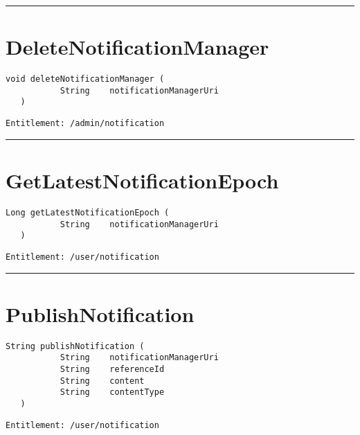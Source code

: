 \rule{12cm}{2pt}
\section{DeleteNotificationManager}
\label{Api:DeleteNotificationManager}
\begin{lstlisting}[style=nonumbers]
   void deleteNotificationManager (
           String    notificationManagerUri
   )
\end{lstlisting}
\begin{Verbatim}[formatcom=\color{Maroon}]
  Entitlement: /admin/notification
\end{Verbatim}



\rule{12cm}{2pt}
\section{GetLatestNotificationEpoch}
\label{Api:GetLatestNotificationEpoch}
\begin{lstlisting}[style=nonumbers]
   Long getLatestNotificationEpoch (
           String    notificationManagerUri
   )
\end{lstlisting}
\begin{Verbatim}[formatcom=\color{Maroon}]
  Entitlement: /user/notification
\end{Verbatim}



\rule{12cm}{2pt}
\section{PublishNotification}
\label{Api:PublishNotification}
\begin{lstlisting}[style=nonumbers]
   String publishNotification (
           String    notificationManagerUri
           String    referenceId
           String    content
           String    contentType
   )
\end{lstlisting}
\begin{Verbatim}[formatcom=\color{Maroon}]
  Entitlement: /user/notification
\end{Verbatim}



